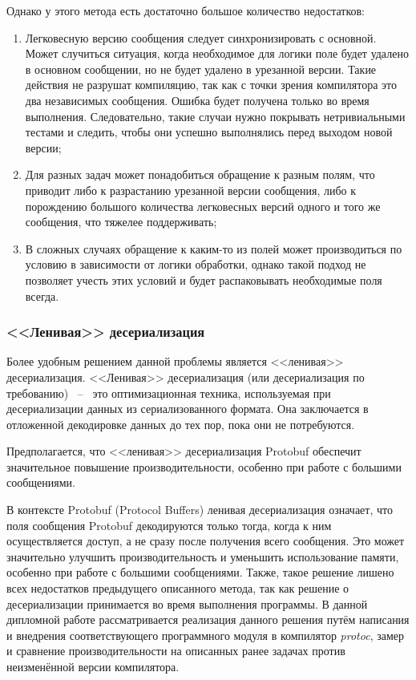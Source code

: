 Однако у этого метода есть достаточно большое количество недостатков:
\begin{enumerate}
    \item Легковесную версию сообщения следует синхронизировать с основной. Может случиться ситуация, когда необходимое для логики поле будет удалено в основном сообщении, но не будет удалено в урезанной версии. Такие действия не разрушат компиляцию, так как с точки зрения компилятора это два независимых сообщения. Ошибка будет получена только во время выполнения. Следовательно, такие случаи нужно покрывать нетривиальными тестами и следить, чтобы они успешно выполнялись перед выходом новой версии;
    \item Для разных задач может понадобиться обращение к разным полям, что приводит либо к разрастанию урезанной версии сообщения, либо к порождению большого количества легковесных версий одного и того же сообщения, что тяжелее поддерживать;
    \item В сложных случаях обращение к каким-то из полей может производиться по условию в зависимости от логики обработки, однако такой подход не позволяет учесть этих условий и будет распаковывать необходимые поля всегда.
\end{enumerate}

\subsubsection{<<Ленивая>> десериализация} 

Более удобным решением данной проблемы является <<ленивая>> десериализация.
<<Ленивая>> десериализация (или десериализация по требованию) ~--~ это оптимизационная техника, используемая при десериализации данных из сериализованного формата. 
Она заключается в отложенной декодировке данных до тех пор, пока они не потребуются.

Предполагается, что <<ленивая>> десериализация Protobuf обеспечит значительное повышение производительности, особенно при работе с большими сообщениями.

В контексте Protobuf (Protocol Buffers) ленивая десериализация означает, что поля сообщения Protobuf декодируются только тогда, когда к ним осуществляется доступ, а не сразу после получения всего сообщения. 
Это может значительно улучшить производительность и уменьшить использование памяти, особенно при работе с большими сообщениями.
Также, такое решение лишено всех недостатков предыдущего описанного метода, так как решение о десериализации принимается во время выполнения программы.
В данной дипломной работе рассматривается реализация данного решения путём написания и внедрения соответствующего программного модуля в компилятор \textit{protoc}, замер и сравнение производительности на описанных ранее задачах против неизменённой версии компилятора.
